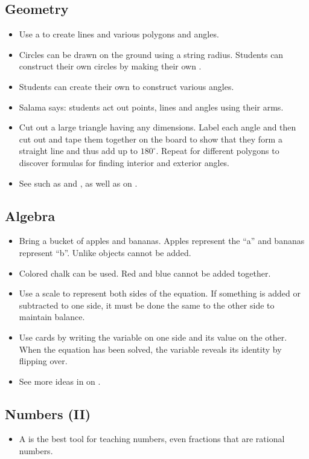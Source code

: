 	\subsection{Geometry} \label{geometry}
	\begin{itemize}
	\item Use a  to create lines and various polygons and angles.
	\item Circles can be drawn on the ground using a string radius. Students can construct their own circles by making their own .
	\item Students can create their own  to construct various angles.
	\item Salama says: students act out points, lines and angles using their arms.
	\item Cut out a large triangle having any dimensions. Label each angle and then cut out and tape them together on the board to show that they form a straight line and thus add up to $180^\circ$. Repeat for different polygons to discover formulas for finding interior and exterior angles.
	\item See  such as  and , as well as  on .
		\end{itemize}
	
	\subsection{Algebra} \label{algebra}
	\begin{itemize}
	\item Bring a bucket of apples and bananas. Apples represent the ``a'' and bananas represent ``b''. Unlike
objects cannot be added.
	\item Colored chalk can be used. Red and blue cannot be added together.
	\item Use a scale to represent both sides of the equation. If something is added or subtracted to one side, it must be done the same to the other side to maintain balance.
	\item Use cards by writing the variable on one side and its value on the other. When the equation has been solved, the variable reveals its identity by flipping over.
	\item See more ideas in  on .
	\end{itemize}
	
	\subsection{Numbers (II)}
	\begin{itemize}
	\item A  is the best tool for teaching numbers, even fractions that are rational numbers.
	\end{itemize}
	
